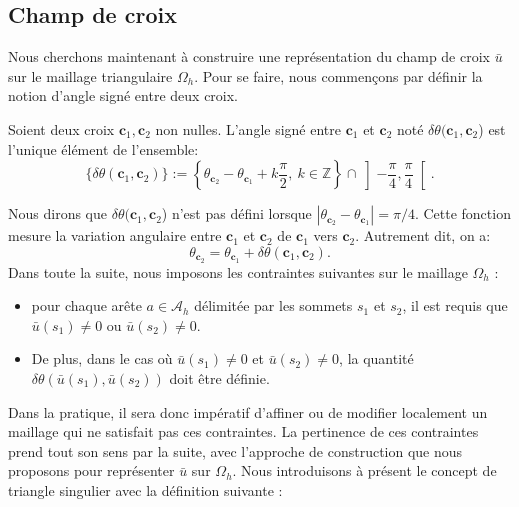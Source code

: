 \subsection{Champ de croix}

Nous cherchons maintenant à construire une représentation du champ de croix $\bar{u}$ sur le maillage triangulaire $\Omega_h$. Pour se faire, nous commençons par définir la notion d'angle signé entre deux croix.

\begin{definition}
Soient deux croix $\mathbf{c}_1,\mathbf{c}_2$ non nulles. L'angle signé entre $\mathbf{c}_1$ et $\mathbf{c}_2$ noté $\delta\theta(\mathbf{c}_1,\mathbf{c}_2$) est l'unique élément de l'ensemble:
$$
\{\delta\theta(\mathbf{c}_1,\mathbf{c}_2)\}:=\left\{\theta_{\mathbf{c}_2}-\theta_{\mathbf{c}_1}+k\frac{\pi}{2},~k\in\mathbb{Z}\right\}\cap\left]-\frac{\pi}{4}, \frac{\pi}{4}\right[.
$$
\end{definition}
Nous dirons que $\delta\theta(\mathbf{c}_1,\mathbf{c}_2$) n'est pas défini lorsque $|\theta_{\mathbf{c}_2}-\theta_{\mathbf{c}_1}|=\pi/4$. Cette fonction mesure la variation angulaire entre $\mathbf{c}_1$ et $\mathbf{c}_2$ de $\mathbf{c}_1$ vers $\mathbf{c}_2$. Autrement dit, on a:
$$
\theta_{\mathbf{c}_2}=\theta_{\mathbf{c}_1}+\delta\theta(\mathbf{c}_1,\mathbf{c}_2).
$$
Dans toute la suite, nous imposons les contraintes suivantes sur le maillage $\Omega_h$ :\\[-0.2cm]
\begin{itemize}
 \item pour chaque arête $a\in\mathcal{A}_h$ délimitée par les sommets $s_1$ et $s_2$, il est requis que $\bar{u}(s_1)\neq 0$ ou $\bar{u}(s_2)\neq 0$.\\[-0.2cm]
 \item De plus, dans le cas où $\bar{u}(s_1)\neq 0$ et $\bar{u}(s_2)\neq 0$, la quantité $\delta\theta(\bar{u}(s_1), \bar{u}(s_2))$ doit être définie.\\[-0.2cm]
\end{itemize}
Dans la pratique, il sera donc impératif d'affiner ou de modifier localement un maillage qui ne satisfait pas ces contraintes. La pertinence de ces contraintes prend tout son sens par la suite, avec l'approche de construction que nous proposons pour représenter $\bar{u}$ sur $\Omega_h$. Nous introduisons à présent le concept de triangle singulier avec la définition suivante :

